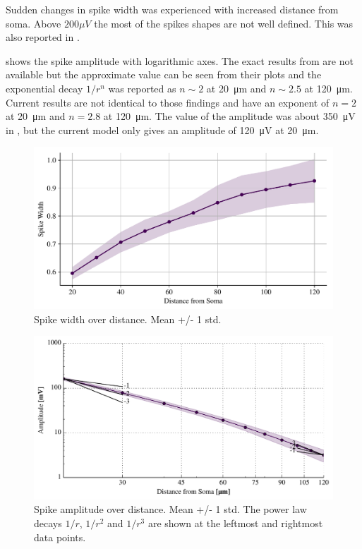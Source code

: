 \documentclass[altfont, fleqn]{uiophd}
\renewcommand{\Cref}[1]{{\color{viridis_03}\myCref{#1}}}
\begin{document}
Sudden changes in spike width was experienced with increased distance from
soma. Above $200\mu V$ the
most of the spikes shapes are not well defined. 
This was also reported in \textcite{pettersen_amplitude_2008}\@.

\Cref{fig:4_1_spike_amp} shows the spike amplitude with logarithmic axes.  
The exact results from 
\textcite{pettersen_amplitude_2008}
are not available but 
the approximate value can be seen from their plots and
the exponential decay
$1 / r^n$
was reported
as  $n \sim 2$ at \SI{20}{\micro\metre} and 
$n \sim 2.5$ at \SI{120}{\micro\metre}.
Current results are not identical to those findings
and have an exponent 
of $n = 2$ at \SI{20}{\micro\metre}
and $n = 2.8$ at \SI{120}{\micro\metre}.
The value of the amplitude was about
\SI{350}{\micro\volt} in 
\textcite{pettersen_amplitude_2008}, 
but the current model only gives an amplitude of 
\SI{120}{\micro\volt} 
at 
\SI{20}{\micro\metre}.

\begin{figure}[thp]
\centering
\includegraphics[width=\textwidth]{images/sec_4/disc_spike_width_II.pdf}
\caption{Spike width over distance. Mean +/- 1 std.}
\label{fig:4_1_spike_width}
\end{figure}

\begin{figure}[thp]
    \centering
    \includegraphics[width=\textwidth]{images/4_1/disc_spike_amps_I_log.pdf}
    \caption{Spike amplitude over distance. Mean +/- 1 std. The power law
    decays $1/r$, $1/r^2$ and $1/r^3$ are shown at the leftmost and rightmost
    data points.}
    \label{fig:4_1_spike_amp}
\end{figure}
\end{document}
